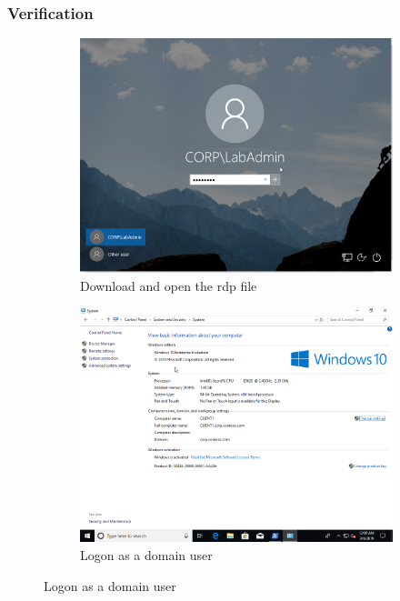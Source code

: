 \subsubsection{Verification}
\begin{figure}[h]
	\begin{subfigure}{0.5\textwidth}
		\captionsetup{width=0.8\linewidth}
		\includegraphics[width=0.9\linewidth]{img/Methodologie/Verification4.png}
		\centering
		\caption{Download and open the \acrshort{rdp} file}
		\label{fig:verificationMIG0}
	\end{subfigure}
	\begin{subfigure}{0.5\textwidth}
		\captionsetup{width=0.8\linewidth}
		\includegraphics[width=0.9\linewidth]{img/Methodologie/Verification5.png} 
		\centering
		\caption{Logon as a domain user}
		\label{fig:verificationMIG1}
	\end{subfigure}
\end{figure}
